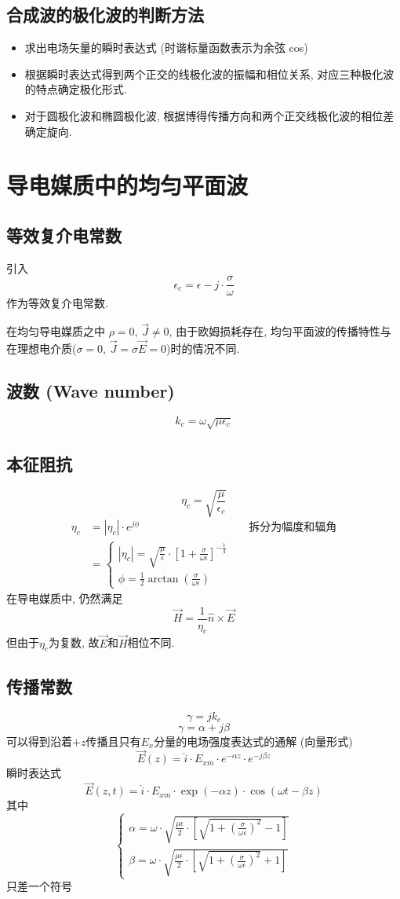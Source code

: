 \documentclass[a4paper]{report}
\begin{document}
\subsection{合成波的极化波的判断方法}
\begin{itemize}
    \item 求出电场矢量的瞬时表达式 (时谐标量函数表示为余弦 cos)
    \item 根据瞬时表达式得到两个正交的线极化波的振幅和相位关系, 对应三种极化波的特点确定极化形式. 
    \item 对于圆极化波和椭圆极化波, 根据博得传播方向和两个正交线极化波的相位差确定旋向. 
\end{itemize}
\section{导电媒质中的均匀平面波}
\subsection{等效复介电常数}
引入$$\epsilon_c=\epsilon-j\cdot\frac{\sigma}{\omega}$$
作为等效复介电常数. 
\par 在均匀导电媒质之中 $\rho=0,\,\vec{J}\neq 0$, 由于欧姆损耗存在, 均匀平面波的传播特性与在理想电介质($\sigma=0,\,\vec{J}=\sigma\vec{E}=0$)时的情况不同. 
\subsection{波数 (Wave number)}
$$k_c=\omega\sqrt{\mu\epsilon_c}$$
\subsection{本征阻抗}
$$\eta_c=\sqrt{\frac{\mu}{\epsilon_c}}$$
\begin{align*}
    \eta_c&=|\eta_c|\cdot e^{j\phi}&&\text{拆分为幅度和辐角}\\
    &=\begin{cases}
        |\eta_c|=\sqrt{\frac{\mu}{\epsilon}}\cdot [1+\frac{\sigma}{\omega\epsilon}]^{-\frac{1}{4}}\\
        \phi=\frac{1}{2}\arctan(\frac{\sigma}{\omega\epsilon})
    \end{cases}
\end{align*}
在导电媒质中, 仍然满足$$\vec{H}=\frac{1}{\eta_c} \hat{n}\times \vec{E}  $$
但由于$\eta_c$为复数, 故$\vec{E} $和$\vec{H} $相位不同. 
\subsection{传播常数}
$$\gamma=jk_c$$
$$\gamma=\alpha+j\beta$$
可以得到沿着$+z$传播且只有$E_x$分量的电场强度表达式的通解 (向量形式)
$$\vec{E}(z)=\hat{i}\cdot E_{xm}\cdot e^{-\alpha z}\cdot e^{-j\beta z} $$
瞬时表达式  
$$\vec{E}(z,t)=\hat{i}\cdot E_{xm}\cdot \exp(-\alpha z)\cdot \cos(\omega t-\beta z) $$
其中
$$\begin{cases}
    \alpha=\omega\cdot \sqrt{\frac{\mu\epsilon}{2}\cdot[\sqrt{1+(\frac{\sigma}{\omega\epsilon})^2}-1]}\\
    \beta=\omega\cdot \sqrt{\frac{\mu\epsilon}{2}\cdot[\sqrt{1+(\frac{\sigma}{\omega\epsilon})^2}+1]}
\end{cases}$$
只差一个符号
\end{document}
